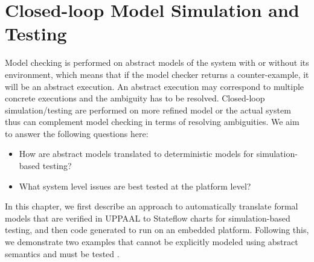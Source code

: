 \chapter{Closed-loop Model Simulation and Testing}
Model checking is performed on abstract models of the system with or without its environment, which means that if the model checker returns a counter-example, it will be an abstract execution. An abstract execution may correspond to multiple concrete executions and the ambiguity has to be resolved. Closed-loop simulation/testing are performed on more refined model or the actual system thus can complement model checking in terms of resolving ambiguities. We aim to answer the following questions here:

\begin{itemize}
	\vspace{-5pt}
	\item How are abstract models translated to deterministic models for simulation-based testing?
	\vspace{-5pt}
	\item What system level issues are best tested at the platform level?
\end{itemize}

In this chapter, we first describe an approach to automatically translate formal models that are verified in UPPAAL to Stateflow charts for simulation-based testing, and then code generated to run on an embedded platform. Following this, we demonstrate two examples that cannot be explicitly modeled using abstract semantics and must be tested .

